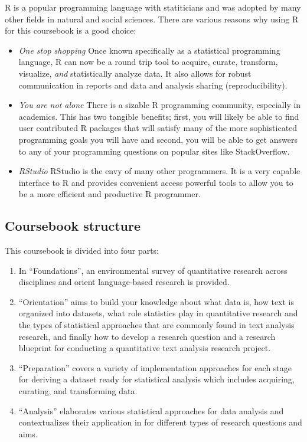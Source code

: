 \documentclass[
]{article}
\providecommand{\tightlist}{%
  \setlength{\itemsep}{0pt}\setlength{\parskip}{0pt}}
\begin{document}
R is a popular programming language with statiticians and was adopted by many other fields in natural and social sciences. There are various reasons why using R for this coursebook is a good choice:

\begin{itemize}
\tightlist
\item
  \emph{One stop shopping} Once known specifically as a statistical programming language, R can now be a round trip tool to acquire, curate, transform, visualize, \emph{and} statistically analyze data. It also allows for robust communication in reports and data and analysis sharing (reproducibility).
\item
  \emph{You are not alone} There is a sizable R programming community, especially in academics. This has two tangible benefits; first, you will likely be able to find user contributed R packages that will satisfy many of the more sophisticated programming goals you will have and second, you will be able to get answers to any of your programming questions on popular sites like StackOverflow.
\item
  \emph{RStudio} RStudio is the envy of many other programmers. It is a very capable interface to R and provides convenient access powerful tools to allow you to be a more efficient and productive R programmer.
\end{itemize}

\hypertarget{coursebook-structure}{%
\subsection*{Coursebook structure}\label{coursebook-structure}}

This coursebook is divided into four parts:

\begin{enumerate}
\def\labelenumi{\arabic{enumi}.}
\tightlist
\item
  In ``Foundations'', an environmental survey of quantitative research across disciplines and orient language-based research is provided.
\item
  ``Orientation'' aims to build your knowledge about what data is, how text is organized into datasets, what role statistics play in quantitative research and the types of statistical approaches that are commonly found in text analysis research, and finally how to develop a research question and a research blueprint for conducting a quantitative text analysis research project.
\item
  ``Preparation'' covers a variety of implementation approaches for each stage for deriving a dataset ready for statistical analysis which includes acquiring, curating, and transforming data.
\item
  ``Analysis'' elaborates various statistical approaches for data analysis and contextualizes their application in for different types of research questions and aims.
\end{enumerate}
\end{document}
